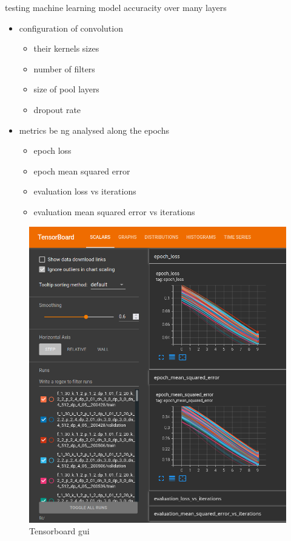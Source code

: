\documentclass[
    11pt,
    oneside
]{report}
\begin{document}
testing machine learning model accuracity over many layers
\begin{itemize}
\item
configuration of convolution
\begin{itemize}
    \item
      their kernels sizes
    \item
      number of filters
    \item
      size of pool layers
    \item
      dropout rate
\end{itemize}
\item
    metrics be ng analysed along the epochs
\begin{itemize}
    \item
        epoch loss
    \item
        epoch mean squared error
    \item
        evaluation loss vs iterations
    \item
        evaluation mean squared error vs iterations
\end{itemize}
\end{itemize}



\begin{figure}[H]
    \includegraphics[keepaspectratio, width=\columnwidth]{Screenshot_2022-04-17_23-06-29.png}
    \caption{Tensorboard gui}
    \label{img:tensorboard_gui}
\end{figure}
\end{document}
